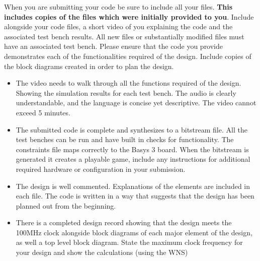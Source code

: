 When you are submitting your code be sure to include all your files. \textbf{This includes copies of the files which were initially provided to you}. Include alongside your code files, a short video of you explaining the code and the associated test bench results. All new files or substantially modified files must have an associated test bench. Please ensure that the code you provide demonstrates each of the functionalities required of the design. Include copies of the block diagrams created in order to plan the design. 

\begin{itemize}
    \item The video needs to walk through all the functions required of the design. Showing the simulation results for each test bench. The audio is clearly understandable, and the language is concise yet descriptive. The video cannot exceed 5 minutes. \begin{flushright}
    \end{flushright}
    
    \item The submitted code is complete and synthesizes to a bitstream file. All the test benches can be run and have built in checks for functionality. The constraints file maps correctly to the Basys 3 board. When the bitstream is generated it creates a playable game, include any instructions for additional required hardware or configuration in your submission. \begin{flushright}
    
    \end{flushright}
    \item The design is well commented. Explanations of the elements are included in each file. The code is written in a way that suggests that the design has been planned out from the beginning. \begin{flushright}
    
    \end{flushright}
    \item There is a completed design record showing that the design meets the 100MHz clock alongside block diagrams of each major element of the design, as well a top level block diagram. State the maximum clock frequency for your design and show the calculations (using the WNS) \begin{flushright}
    \end{flushright}
    
\end{itemize}